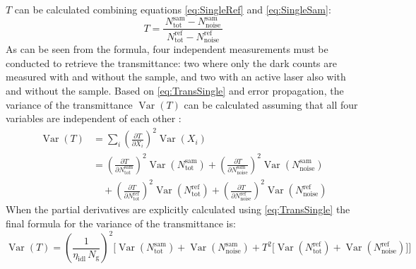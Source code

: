 $T$ can be calculated combining equations \ref{eq:SingleRef} and \ref{eq:SingleSam}:
\begin{equation}
	T = 
	\frac{\,N_{\text{tot}}^{\text{sam}} - N_{\text{noise}}^{\text{sam}}\,}
	{\,N_{\text{tot}}^{\text{ref}} - N_{\text{noise}}^{\text{ref}}\,}
	\label{eq:TransSingle}
\end{equation}
As can be seen from the formula, four independent measurements must be conducted to retrieve the transmittance: two where only the dark counts are measured with and without the sample, and two with an active laser also with and without the sample. 
\newpage
Based on \autoref{eq:TransSingle} and error propagation, the variance of the transmittance $\operatorname{Var}(T)$ can be calculated assuming that all four variables are independent of each other \cite{kuNotesUsePropagation1966}: 
\begin{equation}
	\begin{aligned}
		\operatorname{Var}(T) 
		&= \sum_{i} \left( \frac{\partial T}{\partial X_i} \right)^{2} 
		\operatorname{Var}\!\left( X_i \right) \\[0.75em]
		&= \left( \frac{\partial T}{\partial N_{\text{tot}}^{\text{sam}}} \right)^{2} 
		\operatorname{Var}\!\left( N_{\text{tot}}^{\text{sam}} \right)
		+ \left( \frac{\partial T}{\partial N_{\text{noise}}^{\text{sam}}} \right)^{2} 
		\operatorname{Var}\!\left( N_{\text{noise}}^{\text{sam}} \right) \\[0.75em]
		&\quad + \left( \frac{\partial T}{\partial N_{\text{tot}}^{\text{ref}}} \right)^{2} 
		\operatorname{Var}\!\left( N_{\text{tot}}^{\text{ref}} \right)
		+ \left( \frac{\partial T}{\partial N_{\text{noise}}^{\text{ref}}} \right)^{2} 
		\operatorname{Var}\!\left( N_{\text{noise}}^{\text{ref}} \right)
	\end{aligned}
	\label{eq:VarianceTransGen}
\end{equation}
When the partial derivatives are explicitly calculated using \autoref{eq:TransSingle} the final formula for the variance of the transmittance is:
\begin{equation}
		\operatorname{Var}(T) 
		= \left( \frac{1}{\eta_{\text{idl}}\,N_{\mathrm{g}}} \right)^{2}
		\Bigg[
		\operatorname{Var}\!\left(N_{\text{tot}}^{\text{sam}}\right) 
		+ \operatorname{Var}\!\left(N_{\text{noise}}^{\text{sam}}\right) 
		+ T^{2} \Big[ 
		\operatorname{Var}\!\left(N_{\text{tot}}^{\text{ref}}\right) 
		+ \operatorname{Var}\!\left(N_{\text{noise}}^{\text{ref}}\right) 
		\Big]
		\Bigg]
	\label{eq:VarianceTransExpl}
\end{equation}
